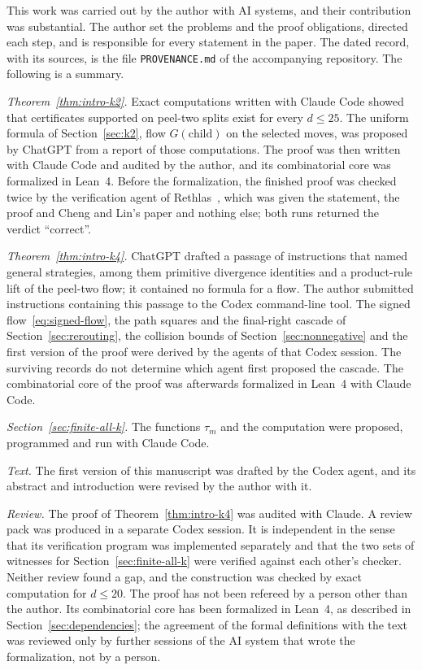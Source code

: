 \documentclass[11pt]{amsart}
\theoremstyle{definition}
\theoremstyle{remark}
\begin{document}
This work was carried out by the author with AI systems, and their
contribution was substantial.  The author set the problems and the proof
obligations, directed each step, and is responsible for every statement in
the paper.  The dated record, with its sources, is the file
\texttt{PROVENANCE.md} of the accompanying repository.  The following is a
summary.

\emph{Theorem~\ref{thm:intro-k2}.}  Exact computations written with Claude Code showed that certificates supported on
peel-two splits exist for every $d\le25$.  The uniform formula of
Section~\ref{sec:k2}, flow $G(\text{child})$ on the selected moves, was
proposed by ChatGPT from a report of those computations. The proof
was then written with Claude Code and audited by the author, and its combinatorial core was
formalized in Lean~4. Before the formalization, the finished proof was checked twice by the verification agent of Rethlas~\cite{Rethlas}, which was given the statement, the proof and Cheng and Lin's paper and nothing else; both runs returned the verdict ``correct''.

\emph{Theorem~\ref{thm:intro-k4}.} ChatGPT drafted a passage of instructions
that named general strategies, among them primitive divergence identities and
a product-rule lift of the peel-two flow; it contained no formula for a flow.
The author submitted instructions containing this passage to the Codex
command-line tool.  The signed flow~\eqref{eq:signed-flow}, the path
squares and the final-right cascade of Section~\ref{sec:rerouting}, the
collision bounds of Section~\ref{sec:nonnegative} and the first version of the
proof were derived by the agents of that Codex session. The surviving
records do not determine which agent first proposed the cascade.  The
combinatorial core of the proof was afterwards formalized in Lean~4 with
Claude Code.

\emph{Section~\ref{sec:finite-all-k}.}  The functions $\tau_m$ and the
computation were proposed, programmed and run with Claude Code.

\emph{Text.}  The first version of this manuscript was drafted by the Codex
agent, and its abstract and introduction were revised by the author with it.

\emph{Review.}  The proof of Theorem~\ref{thm:intro-k4} was audited with
Claude. A review pack was
produced in a separate Codex session.  It is independent in the sense that its verification program was implemented separately and that the two sets of witnesses for Section~\ref{sec:finite-all-k} were verified against each other's checker. Neither review found a gap, and the construction was checked by exact computation for $d\le20$.  The proof has not been refereed by a person other than the author.  Its combinatorial core has been formalized in Lean~4, as described in Section~\ref{sec:dependencies}; the agreement of the formal definitions with the text was reviewed only by further sessions of the AI system that wrote the formalization, not by a person.
\end{document}
